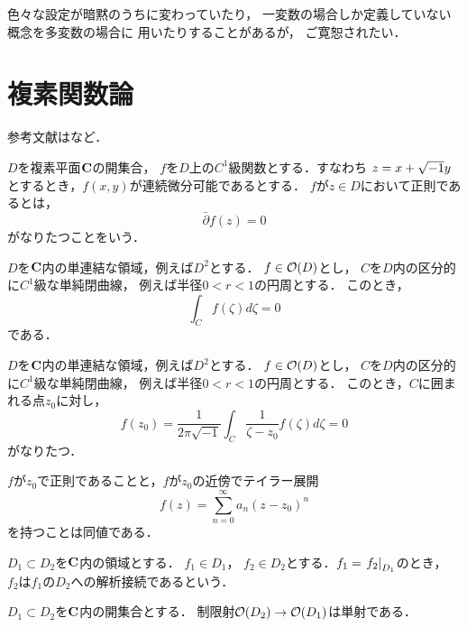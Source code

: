 色々な設定が暗黙のうちに変わっていたり，
一変数の場合しか定義していない概念を多変数の場合に
用いたりすることがあるが，
ご寛恕されたい．
\section{複素関数論}

参考文献は\cite{J95}など．

\(D\)を複素平面\(\cc\)の開集合，
\(f\)を\(D\)上の\(C^1\)級関数とする．すなわち
\(z=x+\iu y\)とするとき，\(f(x,y)\)が連続微分可能であるとする．
\(f\)が\(z\in D\)において正則であるとは，
\[
    \bar{\partial}f(z)=0
\]
がなりたつことをいう．

\begin{THM}[コーシーの積分定理]
  \(D\)を\(\cc\)内の単連結な領域，例えば\(D^2\)とする．
  \(f\in\cO(D)\)とし，
  \(C\)を\(D\)内の区分的に\(C^1\)級な単純閉曲線，
  例えば半径\(0<r<1\)の円周とする．
  このとき，
  \[
    \int_{C}f(\zeta)d\zeta=0
  \]
  である．
\end{THM}
\begin{THM}[コーシーの積分定理]
  \(D\)を\(\cc\)内の単連結な領域，例えば\(D^2\)とする．
  \(f\in\cO(D)\)とし，
  \(C\)を\(D\)内の区分的に\(C^1\)級な単純閉曲線，
  例えば半径\(0<r<1\)の円周とする．
  このとき，\(C\)に囲まれる点\(z_0\)に対し，
  \[
    f(z_0)=\frac{1}{2\pi\sqrt{-1}}\int_{C}\frac{1}{\zeta-z_0}f(\zeta)d\zeta=0
  \]
  がなりたつ．
\end{THM}

\(f\)が\(z_0\)で正則であることと，\(f\)が\(z_0\)の近傍でテイラー展開
\[
  f(z)=\sum_{n=0}^{\infty}a_n(z-z_0)^n
\]
を持つことは同値である．

\begin{DFN}
  \(D_{1}\subset D_{2}\)を\(\cc\)内の領域とする．
  \(f_{1}\in D_{1}\)，
  \(f_{2}\in D_{2}\)とする．\(f_{1}=\mres[f_{2}]{D_{1}}\)のとき，
  \(f_{2}\)は\(f_{1}\)の\(D_{2}\)への解析接続であるという．
\end{DFN}
\begin{THM}[一致の定理]
  \(D_{1}\subset D_{2}\)を\(\cc\)内の開集合とする．
  制限射\(\cO(D_2)\to \cO(D_1)\)は単射である．
\end{THM}

